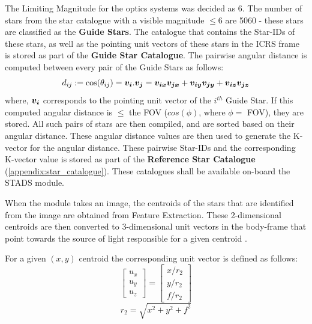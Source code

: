 \documentclass[../../main.tex]{subfiles}
\begin{document}
The Limiting Magnitude for the optics systems was decided as 6. The number of stars from the star catalogue with a visible magnitude $\le 6$ are 5060 - these stars are classified as the \textbf{Guide Stars}. The catalogue that contains the Star-IDs of these stars, as well as the pointing unit vectors of these stars in the ICRS frame is stored as part of the \textbf{Guide Star Catalogue}.
The pairwise angular distance is computed between every pair of the Guide Stars as follows:
\begin{equation}
    d_{ij} := \cos(\theta_{ij}) = \boldsymbol{v_i}.\boldsymbol{v_j} = \boldsymbol{v_{ix}}\boldsymbol{v_{jx}} + \boldsymbol{v_{iy}}\boldsymbol{v_{jy}} + \boldsymbol{v_{iz}}\boldsymbol{v_{jz}}
    \label{eq:ST_AngDst}
\end{equation}
where, $\boldsymbol{v_i}$ corresponds to the pointing unit vector of the $i^{th}$ Guide Star.
If this computed angular distance is $\le$ the FOV ($cos(\phi)$, where $\phi=$ FOV), they are stored.
All such pairs of stars are then compiled, and are sorted based on their angular distance. These angular distance values are then used to generate the K-vector for the angular distance. These pairwise Star-IDs and the corresponding K-vector value is stored as part of the \textbf{Reference Star Catalogue} (\ref{appendix:star_catalogue}). These catalogues shall be available on-board the STADS module.

 
When the module takes an image, the centroids of the stars that are identified from the image are obtained from Feature Extraction. These 2-dimensional centroids are then converted to 3-dimensional unit vectors in the body-frame that point towards the source of light responsible for a given centroid \cite{erlank2013development}.

For a given $(x, y)$ centroid the corresponding unit vector is defined as follows:
\begin{equation}
    \begin{bmatrix} u_{x} \\ u_{y} \\ u_{z} \end{bmatrix} = \begin{bmatrix} x/r_{2} \\ y/r_{2} \\ f/r_{2} \end{bmatrix}
\end{equation}
\begin{equation}
    r_{2} = \sqrt{x^2 + y^2 + f^2}
\end{equation}
\end{document}

